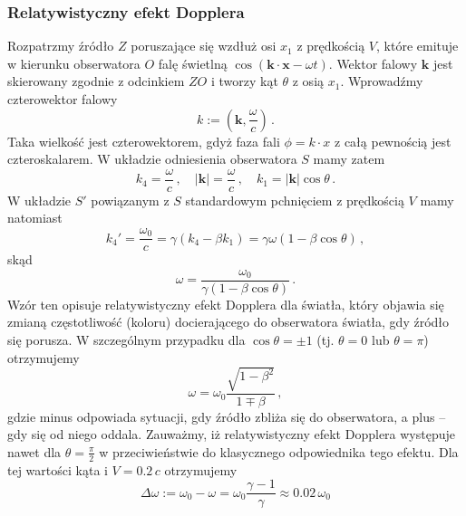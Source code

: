 \documentclass[../main.tex]{subfiles}
\begin{document}
\subsubsection{Relatywistyczny efekt Dopplera}
Rozpatrzmy źródło \(Z\) poruszające się wzdłuż osi \(x_1\) z prędkością \(V\), które emituje w kierunku obserwatora \(O\) falę świetlną \(\cos(\mathbf{k}\cdot\mathbf{x}-\omega t)\). Wektor falowy \(\mathbf{k}\) jest skierowany zgodnie z odcinkiem \(ZO\) i tworzy kąt \(\theta\) z osią \(x_1\). Wprowadźmy czterowektor falowy
\begin{equation*}
    k:=\left(\mathbf{k},\frac{\omega}{c}\right)\,.
\end{equation*}
Taka wielkość jest czterowektorem, gdyż faza fali \(\phi=k\cdot x\) z całą pewnością jest czteroskalarem. W układzie odniesienia obserwatora \(S\) mamy zatem
\begin{equation*}
    k_4=\frac{\omega}{c}\,,\quad |\mathbf{k}|=\frac{\omega}{c}\,,\quad k_1=|\mathbf{k}|\cos\theta\,.
\end{equation*}
W układzie \(S'\) powiązanym z \(S\) standardowym pchnięciem z prędkością \(V\) mamy natomiast
\begin{equation*}
    k_4'=\frac{\omega_0}{c}=\gamma(k_4-\beta k_1)=\gamma\omega(1-\beta\cos\theta)\,,
\end{equation*}
skąd
\begin{equation*}
    \omega=\frac{\omega_0}{\gamma(1-\beta\cos\theta)}\,.
\end{equation*}
Wzór ten opisuje relatywistyczny efekt Dopplera dla światła, który objawia się zmianą częstotliwość (koloru) docierającego do obserwatora światła, gdy źródło się porusza. W szczególnym przypadku dla \(\cos\theta=\pm 1\) (tj. \(\theta=0\) lub \(\theta=\pi\)) otrzymujemy
\begin{equation*}
    \omega=\omega_0\frac{\sqrt{1-\beta^2}}{1\mp\beta}\,,
\end{equation*}
gdzie minus odpowiada sytuacji, gdy źródło zbliża się do obserwatora, a plus -- gdy się od niego oddala. Zauważmy, iż relatywistyczny efekt Dopplera występuje nawet dla \(\theta=\frac{\pi}{2}\) w przeciwieństwie do klasycznego odpowiednika tego efektu. Dla tej wartości kąta i \(V=0.2\,c\) otrzymujemy
\begin{equation*}
    \Delta\omega:=\omega_0-\omega=\omega_0\frac{\gamma-1}{\gamma}\approx 0.02\,\omega_0
\end{equation*}
\end{document}
